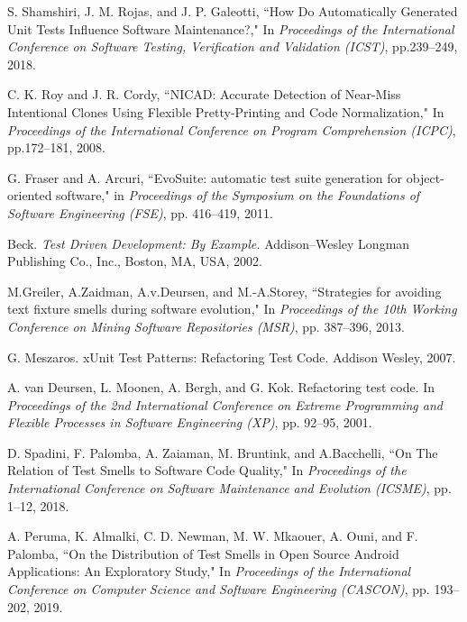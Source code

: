 \documentclass[conference]{IEEEtran}
\begin{document}
\begin{thebibliography}{15}
 S. Shamshiri, J. M. Rojas, and J. P. Galeotti, ``How Do Automatically Generated Unit Tests Influence Software Maintenance?," In {\it Proceedings of the International Conference on Software Testing, Verification and Validation (ICST)}, pp.239--249, 2018. 

 C. K. Roy and J. R. Cordy, ``NICAD: Accurate Detection of Near-Miss Intentional Clones Using Flexible Pretty-Printing and Code Normalization," In {\it Proceedings of the International Conference on Program Comprehension (ICPC)}, pp.172--181, 2008.

 G. Fraser and A. Arcuri, ``EvoSuite: automatic test suite generation for object-oriented software," in  {\it Proceedings of the Symposium on the Foundations of Software Engineering (FSE)}, pp. 416--419, 2011.

 Beck. {\it Test Driven Development: By Example.} Addison--Wesley Longman Publishing Co., Inc., Boston, MA, USA, 2002. 


 M.Greiler, A.Zaidman, A.v.Deursen, and M.-A.Storey, ``Strategies for avoiding text fixture smells during software evolution," In {\it Proceedings of the 10th Working Conference on Mining Software Repositories (MSR)}, pp. 387--396, 2013.

 G. Meszaros. xUnit Test Patterns: Refactoring Test Code. Addison Wesley, 2007.

 A. van Deursen, L. Moonen, A. Bergh, and G. Kok. Refactoring test code. In {\it Proceedings of the 2nd International Conference on Extreme Programming and Flexible Processes in Software Engineering (XP)}, pp. 92--95, 2001.

 D. Spadini, F. Palomba, A. Zaiaman, M. Bruntink, and A.Bacchelli, ``On The Relation of Test Smells to Software Code Quality," In {\it Proceedings of the International Conference on Software Maintenance and Evolution (ICSME)}, pp. 1--12, 2018. 

 A. Peruma, K. Almalki, C. D. Newman, M. W. Mkaouer, A. Ouni, and F. Palomba, ``On the Distribution of Test Smells in Open Source Android Applications: An Exploratory Study," In {\it Proceedings of the International Conference on Computer Science and Software Engineering (CASCON)}, pp. 193--202, 2019.


\end{thebibliography}
\end{document}
